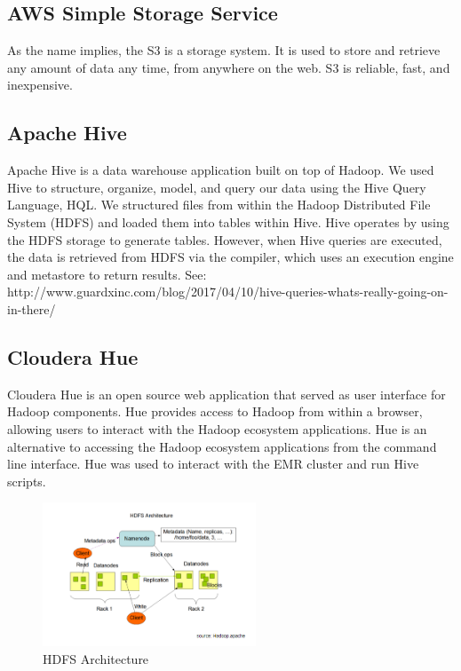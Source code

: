 \documentclass[journal]{IEEEtran}
\begin{document}
\subsection{AWS Simple Storage Service}

As the name implies, the S3 is a storage system.
It is used to store and retrieve any amount of data any time, from anywhere on the web. 
S3 is reliable, fast, and inexpensive.

\subsection{Apache Hive}

Apache Hive is a data warehouse application built on top of Hadoop. We used Hive to structure, organize, model, and query our data using the Hive Query Language, HQL. We structured files from within the Hadoop Distributed File System (HDFS) and loaded them into tables within Hive. Hive operates by using the HDFS storage to generate tables. However, when Hive queries are executed, the data is retrieved from HDFS via the compiler, which uses an execution engine and metastore to return results. See: http://www.guardxinc.com/blog/2017/04/10/hive-queries-whats-really-going-on-in-there/

\subsection{Cloudera Hue}

Cloudera Hue is an open source web application that served as user interface for Hadoop components.
Hue provides access to Hadoop from within a browser, allowing users to interact with the Hadoop ecosystem applications. 
Hue is an alternative to accessing the Hadoop ecosystem applications from the command line interface.
Hue was used to interact with the EMR cluster and run Hive scripts.

\begin{figure}
    \centering
    \includegraphics[width=2.5in]{HDFS_Arch.png}
    \caption{HDFS Architecture \cite{HDFS}}
    \label{HDFS}
\end{figure}
\end{document}
